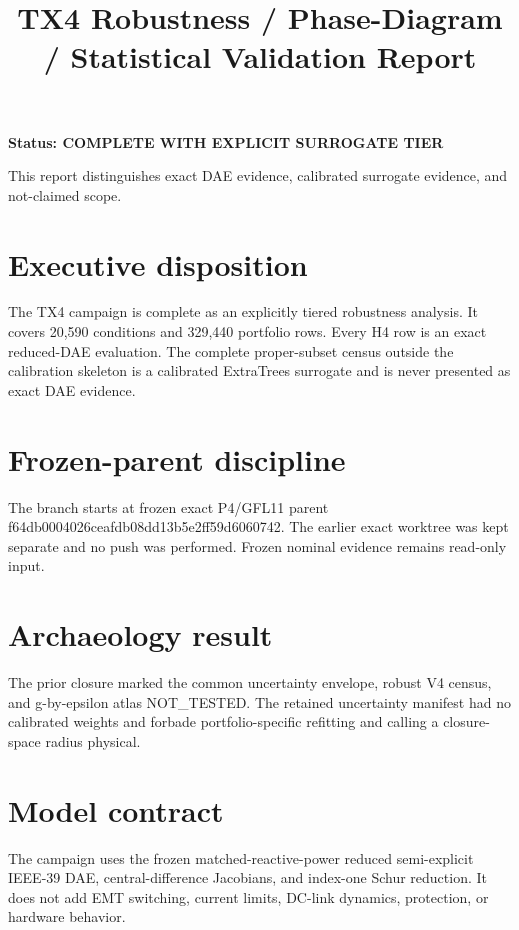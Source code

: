\documentclass[11pt]{article}
\title{TX4 Robustness / Phase-Diagram / Statistical Validation Report}
\begin{document}
\maketitle

\textbf{Status: COMPLETE WITH EXPLICIT SURROGATE TIER}



This report distinguishes exact DAE evidence, calibrated surrogate evidence, and not-claimed scope.

\section{Executive disposition}

The TX4 campaign is complete as an explicitly tiered robustness analysis. It covers 20,590 conditions and 329,440 portfolio rows. Every H4 row is an exact reduced-DAE evaluation. The complete proper-subset census outside the calibration skeleton is a calibrated ExtraTrees surrogate and is never presented as exact DAE evidence.

\section{Frozen-parent discipline}

The branch starts at frozen exact P4/GFL11 parent f64db0004026ceafdb08dd13b5e2ff59d6060742. The earlier exact worktree was kept separate and no push was performed. Frozen nominal evidence remains read-only input.

\section{Archaeology result}

The prior closure marked the common uncertainty envelope, robust V4 census, and g-by-epsilon atlas NOT_TESTED. The retained uncertainty manifest had no calibrated weights and forbade portfolio-specific refitting and calling a closure-space radius physical.

\section{Model contract}

The campaign uses the frozen matched-reactive-power reduced semi-explicit IEEE-39 DAE, central-difference Jacobians, and index-one Schur reduction. It does not add EMT switching, current limits, DC-link dynamics, protection, or hardware behavior.
\end{document}
